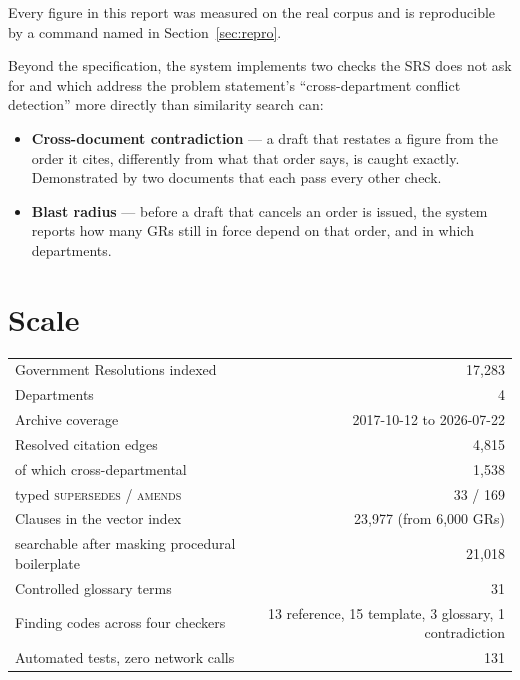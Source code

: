 \documentclass[11pt,a4paper]{article}
\begin{document}
Every figure in this report was measured on the real corpus and is reproducible by a command
named in Section~\ref{sec:repro}.

Beyond the specification, the system implements two checks the SRS does not ask for and which
address the problem statement's ``cross-department conflict detection'' more directly than
similarity search can:

\begin{itemize}[leftmargin=6mm,itemsep=1mm]
\item \textbf{Cross-document contradiction} --- a draft that restates a figure from the order it
      cites, differently from what that order says, is caught exactly. Demonstrated by two
      documents that each pass every other check.
\item \textbf{Blast radius} --- before a draft that cancels an order is issued, the system reports
      how many GRs still in force depend on that order, and in which departments.
\end{itemize}

\section{Scale}

\begin{center}
\begin{tabular}{@{}lr@{}}
\toprule
Government Resolutions indexed & 17{,}283 \\
Departments & 4 \\
Archive coverage & 2017-10-12 to 2026-07-22 \\
Resolved citation edges & 4{,}815 \\
\quad of which cross-departmental & 1{,}538 \\
\quad typed \textsc{supersedes} / \textsc{amends} & 33 / 169 \\
Clauses in the vector index & 23{,}977 (from 6{,}000 GRs) \\
\quad searchable after masking procedural boilerplate & 21{,}018 \\
Controlled glossary terms & 31 \\
Finding codes across four checkers & 13 reference, 15 template, 3 glossary, 1 contradiction \\
Automated tests, zero network calls & 131 \\
\bottomrule
\end{tabular}
\end{center}
\end{document}
